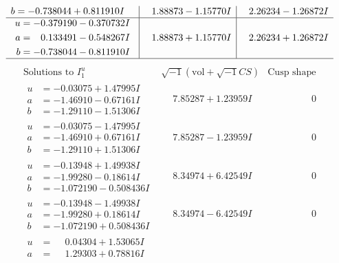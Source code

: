 \documentclass[1p]{elsarticle_modified}
\theoremstyle{definition}
\newcommand{\I}{\sqrt{-1}}
\begin{document}
$$\begin{array}{c|c|c}
\begin{aligned}
b &= -0.738044 + 0.811910 I\end{aligned}
 & \phantom{-}1.88873 - 1.15770 I & \phantom{-}2.26234 - 1.26872 I \\ \hline\begin{aligned}
u &= -0.379190 - 0.370732 I \\
a &= \phantom{-}0.133491 - 0.548267 I \\
b &= -0.738044 - 0.811910 I\end{aligned}
 & \phantom{-}1.88873 + 1.15770 I & \phantom{-}2.26234 + 1.26872 I\\
 \hline 
 \end{array}$$\newpage$$\begin{array}{c|c|c}  
\text{Solutions to }I^u_{1}& \I (\text{vol} + \sqrt{-1}CS) & \text{Cusp shape}\\
 \hline 
\begin{aligned}
u &= -0.03075 + 1.47995 I \\
a &= -1.46910 - 0.67161 I \\
b &= -1.29110 - 1.51306 I\end{aligned}
 & \phantom{-}7.85287 + 1.23959 I & \phantom{-0.000000 } 0 \\ \hline\begin{aligned}
u &= -0.03075 - 1.47995 I \\
a &= -1.46910 + 0.67161 I \\
b &= -1.29110 + 1.51306 I\end{aligned}
 & \phantom{-}7.85287 - 1.23959 I & \phantom{-0.000000 } 0 \\ \hline\begin{aligned}
u &= -0.13948 + 1.49938 I \\
a &= -1.99280 - 0.18614 I \\
b &= -1.072190 - 0.508436 I\end{aligned}
 & \phantom{-}8.34974 + 6.42549 I & \phantom{-0.000000 } 0 \\ \hline\begin{aligned}
u &= -0.13948 - 1.49938 I \\
a &= -1.99280 + 0.18614 I \\
b &= -1.072190 + 0.508436 I\end{aligned}
 & \phantom{-}8.34974 - 6.42549 I & \phantom{-0.000000 } 0 \\ \hline\begin{aligned}
u &= \phantom{-}0.04304 + 1.53065 I \\
a &= \phantom{-}1.29303 + 0.78816 I \\

\end{aligned}
\end{array}$$
\end{document}
